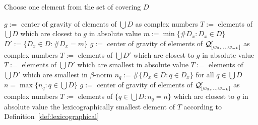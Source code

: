 \begin{algorithm}
   \caption{Choose one element from the set of covering $D$ }
   \label{alg:pickElement}   
  \begin{algorithmic}[1]
    	\STATE $g:=$ center of gravity of elements of $\bigcup D$ as complex numbers
    	\STATE $T:=$ elements of $\bigcup D$ which are closest to $g$ in absolute value
    	\STATE $m:=\min\{\#D_x \colon D_x\in D \}$
    	\STATE $D':=\{D_x \in D \colon \#D_x=m\}$
    		\STATE $g:=$ center of gravity of elements of $\mathcal{Q}_{[w_{0}, \dots, w_{-k}]}'$ as complex numbers
    		\STATE $T:=$ elements of $\bigcup D'$ which are closest to $g$ in absolute value
			\STATE $T:=$ elements of $\bigcup D'$ which are smallest in absolute value
			\STATE $T:=$ elements of $\bigcup D'$ which are smallest in $\beta$-norm
    	\ENDIF
    	\STATE $n_q:=\#\{D_x\in D\colon q\in D_x\}$ for all $q\in \bigcup D$
    	\STATE $n=\max\{n_q\colon q\in \bigcup D \}$
    	\STATE $g:=$ center of gravity of elements of $\mathcal{Q}_{[w_{0}, \dots, w_{-k}]}'$ as complex numbers
    	\STATE $T:=$ elements of $\{q \in \bigcup D \colon n_q=n\}$ which are closest to $g$ in absolute value
    \ENDIF    
    \RETURN the lexicographically smallest element of $T$ according to Definition~\ref{def:lexicographical}

  \end{algorithmic}
\end{algorithm}


